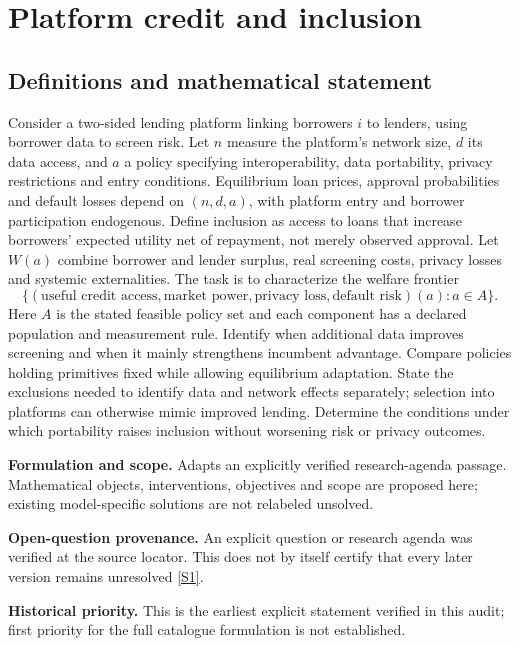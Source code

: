 \documentclass[11pt]{article}
\newcommand{\sref}[2]{\hyperlink{source:#1:#2}{[S#2]}}
\begin{document}
\section*{Platform credit and inclusion}\label{30007610}
\subsection{Definitions and mathematical statement}
Consider a two-sided lending platform linking borrowers \(i\) to lenders, using borrower data to screen risk. Let \(n\) measure the platform's network size, \(d\) its data access, and \(a\) a policy specifying interoperability, data portability, privacy restrictions and entry conditions. Equilibrium loan prices, approval probabilities and default losses depend on \((n,d,a)\), with platform entry and borrower participation endogenous. Define inclusion as access to loans that increase borrowers' expected utility net of repayment, not merely observed approval. Let \(W(a)\) combine borrower and lender surplus, real screening costs, privacy losses and systemic externalities. The task is to characterize the welfare frontier
\[\{(\text{useful credit access},\text{market power},\text{privacy loss},\text{default risk})(a):a\in A\}.\]
Here \(A\) is the stated feasible policy set and each component has a declared population and measurement rule. Identify when additional data improves screening and when it mainly strengthens incumbent advantage. Compare policies holding primitives fixed while allowing equilibrium adaptation. State the exclusions needed to identify data and network effects separately; selection into platforms can otherwise mimic improved lending. Determine the conditions under which portability raises inclusion without worsening risk or privacy outcomes.

\par\textbf{Formulation and scope.} Adapts an explicitly verified research-agenda passage. Mathematical objects, interventions, objectives and scope are proposed here; existing model-specific solutions are not relabeled unsolved.

\par\textbf{Open-question provenance.} An explicit question or research agenda was verified at the source locator. This does not by itself certify that every later version remains unresolved \sref{30007610}{1}.

\par\textbf{Historical priority.} This is the earliest explicit statement verified in this audit; first priority for the full catalogue formulation is not established.
\end{document}
